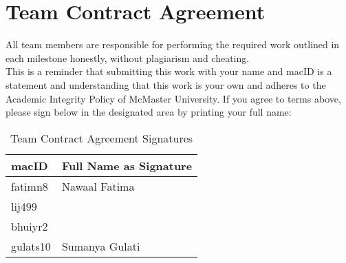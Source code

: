 \documentclass[titlepage]{article}
\begin{document}
\newpage
\section{Team Contract Agreement}
All team members are responsible for performing the required work
outlined in each milestone honestly, without plagiarism and cheating.\\

This is a reminder that submitting this work with your name and macID is a statement 
and understanding that this work is your own and adheres to the Academic Integrity Policy 
of McMaster University. If you agree to terms above, please sign below in the designated 
area by printing your full name:
\begin{table}[H]
    \centering
    \begin{tabular}{|l|l|}
    \hline
    \textbf{macID} & \textbf{Full Name as Signature} \\ \hline
    fatimn8 & Nawaal Fatima          \\ \hline
    lij499  &                        \\ \hline
    bhuiyr2 &                        \\ \hline
    gulats10 & Sumanya Gulati         \\ \hline
    \end{tabular}
    \caption{Team Contract Agreement Signatures}
    \label{tab:team-signatures}
    \end{table}
\end{document}
